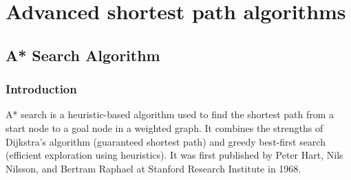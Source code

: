 \section{Advanced shortest path algorithms}
	\subsection{A* Search Algorithm}
		\subsubsection{Introduction}
			A* search is a heuristic-based algorithm used to find the shortest path from a start node to a goal node in a weighted graph. It combines the strengths of Dijkstra's algorithm (guaranteed shortest path) and greedy best-first search (efficient exploration using heuristics). It was first published by Peter Hart, Nils Nilsson, and Bertram Raphael at Stanford Research Institute in 1968.
